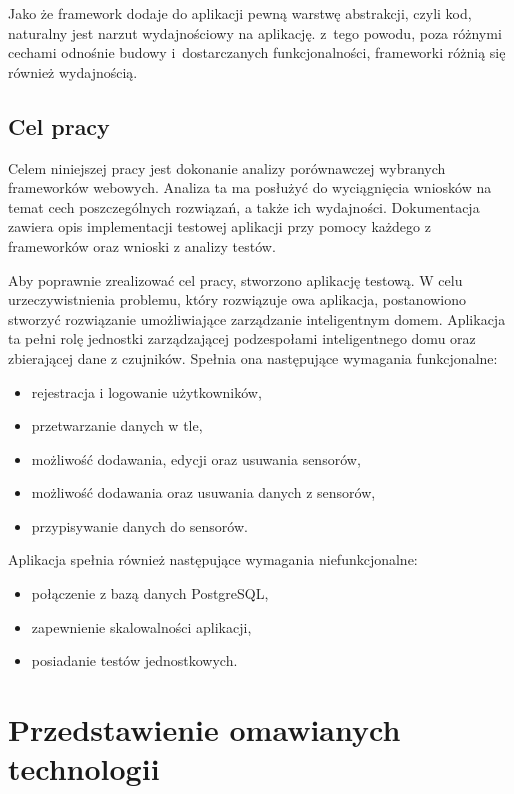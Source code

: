 \documentclass[mgr,oneside]{mgr}
\begin{document}
Jako że framework dodaje do aplikacji pewną warstwę abstrakcji, czyli kod, naturalny jest narzut wydajnościowy na aplikację. z~tego powodu, poza różnymi cechami odnośnie budowy i~dostarczanych funkcjonalności, frameworki różnią się również wydajnością.

\section{Cel pracy}
Celem niniejszej pracy jest dokonanie analizy porównawczej wybranych frameworków webowych. Analiza ta ma posłużyć do wyciągnięcia wniosków na temat cech poszczególnych rozwiązań, a także ich wydajności. Dokumentacja zawiera opis implementacji testowej aplikacji przy pomocy każdego z frameworków oraz wnioski z analizy testów.

Aby poprawnie zrealizować cel pracy, stworzono aplikację testową. W celu urzeczywistnienia problemu, który rozwiązuje owa aplikacja, postanowiono stworzyć rozwiązanie umożliwiające zarządzanie inteligentnym domem. Aplikacja ta pełni rolę jednostki zarządzającej podzespołami inteligentnego domu oraz zbierającej dane z czujników. Spełnia ona następujące wymagania funkcjonalne:
\begin{itemize}
  \item rejestracja i logowanie użytkowników,
  \item przetwarzanie danych w tle,
  \item możliwość dodawania, edycji oraz usuwania sensorów,
  \item możliwość dodawania oraz usuwania danych z sensorów,
  \item przypisywanie danych do sensorów.
\end{itemize}

Aplikacja spełnia również następujące wymagania niefunkcjonalne:
\begin{itemize}
  \item połączenie z bazą danych PostgreSQL,
  \item zapewnienie skalowalności aplikacji,
  \item posiadanie testów jednostkowych.
\end{itemize}

\chapter{Przedstawienie omawianych technologii}
\end{document}
